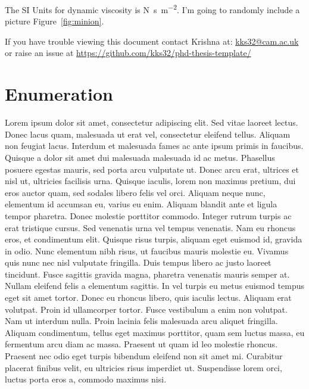 The SI Units for dynamic viscosity is \si{\newton\second\per\metre\squared}.
I'm going to randomly include a picture Figure~\ref{fig:minion}.


If you have trouble viewing this document contact Krishna at: \href{mailto:kks32@cam.ac.uk}{kks32@cam.ac.uk} or raise an issue at \url{https://github.com/kks32/phd-thesis-template/}





\section*{Enumeration}
Lorem ipsum dolor sit amet, consectetur adipiscing elit. Sed vitae laoreet lectus. Donec lacus quam, malesuada ut erat vel, consectetur eleifend tellus. Aliquam non feugiat lacus. Interdum et malesuada fames ac ante ipsum primis in faucibus. Quisque a dolor sit amet dui malesuada malesuada id ac metus. Phasellus posuere egestas mauris, sed porta arcu vulputate ut. Donec arcu erat, ultrices et nisl ut, ultricies facilisis urna. Quisque iaculis, lorem non maximus pretium, dui eros auctor quam, sed sodales libero felis vel orci. Aliquam neque nunc, elementum id accumsan eu, varius eu enim. Aliquam blandit ante et ligula tempor pharetra. Donec molestie porttitor commodo. Integer rutrum turpis ac erat tristique cursus. Sed venenatis urna vel tempus venenatis. Nam eu rhoncus eros, et condimentum elit. Quisque risus turpis, aliquam eget euismod id, gravida in odio. Nunc elementum nibh risus, ut faucibus mauris molestie eu.
 Vivamus quis nunc nec nisl vulputate fringilla. Duis tempus libero ac justo laoreet tincidunt. Fusce sagittis gravida magna, pharetra venenatis mauris semper at. Nullam eleifend felis a elementum sagittis. In vel turpis eu metus euismod tempus eget sit amet tortor. Donec eu rhoncus libero, quis iaculis lectus. Aliquam erat volutpat. Proin id ullamcorper tortor. Fusce vestibulum a enim non volutpat. Nam ut interdum nulla. Proin lacinia felis malesuada arcu aliquet fringilla. Aliquam condimentum, tellus eget maximus porttitor, quam sem luctus massa, eu fermentum arcu diam ac massa. Praesent ut quam id leo molestie rhoncus. Praesent nec odio eget turpis bibendum eleifend non sit amet mi. Curabitur placerat finibus velit, eu ultricies risus imperdiet ut. Suspendisse lorem orci, luctus porta eros a, commodo maximus nisi.

